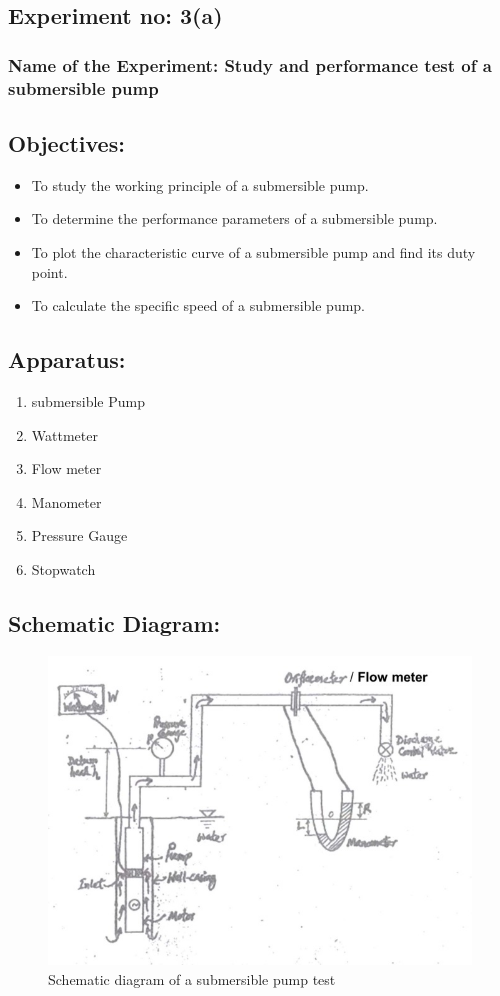 \documentclass[12pt]{article}
\begin{document}
  \subsection*{Experiment no: 3(a)}
  \subsubsection*{Name of the Experiment: Study and performance test of a submersible pump} 
  \vspace*{0.3cm}
  \subsection*{Objectives:}
  \begin{itemize}
    \item To study the working principle of a submersible pump.\item To determine the performance parameters of a submersible pump. 
    \item To plot the characteristic curve of a submersible pump and find its duty point. 
    \item To calculate the specific speed of a submersible pump. 
    
  \end{itemize}
  \subsection*{Apparatus:}
  \begin{enumerate}
    \item submersible Pump 
    \item Wattmeter 
    \item Flow meter 
    \item Manometer 
    \item Pressure Gauge 
    \item Stopwatch 
  \end{enumerate}  
  

  \subsection*{Schematic Diagram:}
  \begin{figure}[h]
    \begin{center}
      \includegraphics*[width=0.60\linewidth]{img/schematic.jpeg}
      \caption{Schematic diagram of a submersible pump test 
      }
    \end{center}
  \end{figure}
\pagebreak
\end{document}
